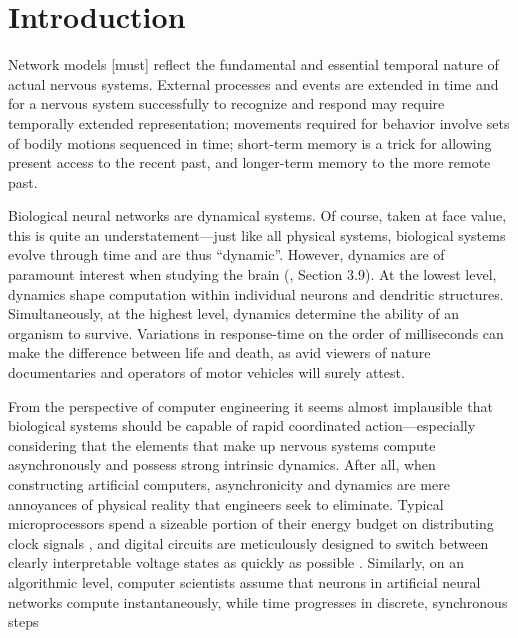 \chapter{Introduction}
\label{chp:introduction}

\begin{OpeningQuote}
Network models [must] reflect the fundamental and
essential temporal nature of actual nervous systems. External processes and
events are extended in time and for a nervous system successfully to recognize
and respond may require temporally extended representation; movements required for behavior involve sets of bodily motions sequenced in time; short-term memory is a trick for allowing present access to the recent past, and
longer-term memory to the more remote past.
\end{OpeningQuote}


Biological neural networks are dynamical systems.
Of course, taken at face value, this is quite an understatement---just like all physical systems, biological systems evolve through time and are thus \enquote{dynamic}.
However, dynamics are of paramount interest when studying the brain (\cite{churchland1992computational}, Section 3.9).
At the lowest level, dynamics shape computation within individual neurons and dendritic structures.
Simultaneously, at the highest level, dynamics determine the ability of an organism to survive.
Variations in response-time on the order of milliseconds can make the difference between life and death, as avid viewers of nature documentaries and operators of motor vehicles will surely attest.

From the perspective of computer engineering it seems almost implausible that biological systems should be capable of rapid coordinated action---especially considering that the elements that make up nervous systems compute asynchronously and possess strong intrinsic dynamics.
After all, when constructing artificial computers, asynchronicity and dynamics are mere annoyances of physical reality that engineers seek to eliminate.
Typical microprocessors spend a sizeable portion of their energy budget on distributing clock signals \citep[e.g.,][]{zhang2008injectionlocked}, and digital circuits are meticulously designed to switch between clearly interpretable voltage states as quickly as possible \citep[e.g.,][Chapter~4]{weste2011cmos}.
Similarly, on an algorithmic level, computer scientists assume that neurons in artificial neural networks compute instantaneously, while time progresses in discrete, synchronous steps \citep[e.g.,][Chapter~10]{goodfellow2016deep}

